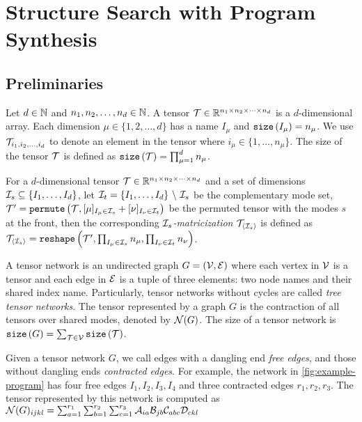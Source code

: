 
\section{Structure Search with Program Synthesis}\label{sec:algo}
%
\subsection{Preliminaries}
\begin{definition}
Let $d \in \mathbb{N}$ and $n_1, n_2, \ldots, n_d \in \mathbb{N}$.
%
A tensor $\mathcal{T} \in \mathbb{R}^{n_1 \times n_2 \times \cdots \times n_d}$ is a $d$-dimensional array.
%
Each dimension $\mu \in \{1, 2, \ldots, d\}$ has a name $I_\mu$ and $\mathtt{size}\left(I_\mu\right) = n_\mu$.
%
We use $\mathcal{T}_{i_1, i_2, \ldots, i_d}$ to denote an element in the tensor where $i_\mu \in \{1, \ldots, n_\mu\}$.
%
The size of the tensor $\mathcal{T}$ is defined as $\mathtt{size}\left(\mathcal{T}\right) = \prod_{\mu=1}^{d} n_\mu$.
\end{definition}

\begin{definition}[Matricization]
For a $d$-dimensional tensor $\mathcal{T} \in \mathbb{R}^{n_1 \times n_2 \times \cdots \times n_d}$ and a set of dimensions $\mathcal{I}_s \subseteq \{I_1,\ldots, I_d\}$, let $\ind_t = \{I_1, \ldots, I_d\}\ \backslash\ \ind_s$ be the complementary mode set, $\mathcal{T}' = \mathtt{permute}\left(\mathcal{T}, [\mu]_{I_\mu \in \mathcal{I}_s} + [\nu]_{I_\nu \in \mathcal{I}_t}\right)$ be the permuted tensor with the modes $s$ at the front, then the corresponding \emph{$\mathcal{I}_s$-matricization} $\mathcal{T}_{\langle\mathcal{I}_s\rangle}$ is defined as $
\mathcal{T}_{\langle\mathcal{I}_s\rangle} = \mathtt{reshape}\left(\mathcal{T}', \prod_{I_\mu \in \mathcal{I}_s} n_{\mu}, \prod_{I_\nu \in \mathcal{I}_t} n_{\nu}\right)$.
\end{definition}
\begin{definition}
A tensor network is an undirected graph $G=(\mathcal{V},\mathcal{E})$ where each vertex in $\mathcal{V}$ is a tensor and each edge in $\mathcal{E}$ is a tuple of three elements: two node names and their shared index name. Particularly, tensor networks without cycles are called \emph{tree tensor networks}. The tensor represented by a graph $G$ is the contraction of all tensors over shared modes, denoted by $\mathcal{N}(G)$. The size of a tensor network is $\mathtt{size}\left(G\right) = \sum_{\mathcal{T} \in \mathcal{V}} \mathtt{size}\left(\mathcal{T}\right)$.
\end{definition}
%
Given a tensor network $G$, we call edges with a dangling end \emph{free edges}, and those without dangling ends \emph{contracted edges}.
%
For example, the network in \autoref{fig:example-program} has four free edges $I_1, I_2, I_3, I_4$ and three contracted edges $r_1, r_2, r_3$.
%
The tensor represented by this network is computed as
$
\mathcal{N}(G)_{ijkl} = \sum_{a=1}^{r_1}\sum_{b=1}^{r_2}\sum_{c=1}^{r_3} \mathcal{A}_{ia}\mathcal{B}_{jb}\mathcal{C}_{abc}\mathcal{D}_{c k l}
$

